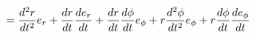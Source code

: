 \documentclass[preview]{standalone}
\begin{document}
\begin{align*}
= {d^2 r \over dt^2} e_r + {d r \over dt} {d e_r \over dt} + {d r \over dt} {d \phi \over dt} e_\phi + r {d^2 \phi \over dt^2} e_\phi + r {d \phi \over dt} {d e_\phi \over dt}
\end{align*}
\end{document}

